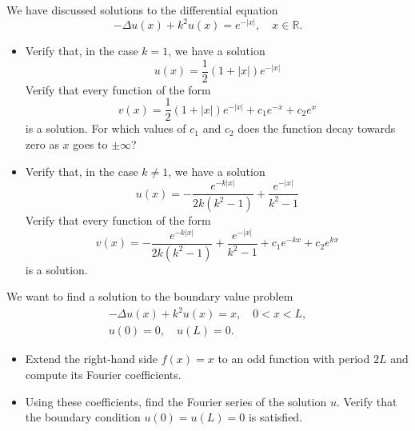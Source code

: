 \documentclass[11pt]{article}
\begin{document}
\begin{exercise}
    We have discussed solutions to the differential equation 
    \[
        - \Delta u(x) + k^2 u(x) = e^{-|x|}, \quad x \in \mathbb R.
    \]
    \begin{itemize}
        \item 
        Verify that, in the case $k=1$, we have a solution 
        \[
            u(x) = \frac 1 2 (1+|x|) e^{-|x|} 
        \]
        Verify that every function of the form 
        \[
            v(x) = \frac 1 2 (1+|x|) e^{-|x|} + c_1 e^{-x} + c_2 e^{x} 
        \]
        is a solution. For which values of $c_1$ and $c_2$ does the function decay towards zero as $x$ goes to $\pm \infty$?
        \item 
        Verify that, in the case $k \neq 1$, we have a solution 
        \[
            u(x) = - \frac{ e^{-k|x|} }{ 2k (k^2-1) } + \frac{ e^{-|x|} }{ k^2-1 }
        \]
        Verify that every function of the form 
        \[
            v(x) = - \frac{ e^{-k|x|} }{ 2k (k^2-1) } + \frac{ e^{-|x|} }{ k^2-1 } + c_1 e^{-kx} + c_2 e^{kx} 
        \]        
        is a solution.
    \end{itemize}
\end{exercise}
\begin{solution}     
\end{solution}







\begin{exercise}
    We want to find a solution to the boundary value problem 
    \begin{gather*}
        - \Delta u(x) + k^2 u(x) = x, \quad 0 < x < L,
        \\
        u(0) = 0, \quad u(L) = 0.
    \end{gather*}
    \begin{itemize}
        \item Extend the right-hand side $f(x) = x$ to an odd function with period $2L$ and compute its Fourier coefficients.
        \item Using these coefficients, find the Fourier series of the solution $u$. Verify that the boundary condition $u(0) = u(L) = 0$ is satisfied.
    \end{itemize}
\end{exercise}
\begin{solution}     
\end{solution}
\end{document}
